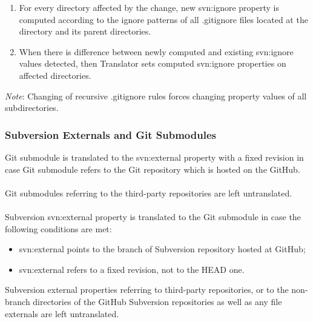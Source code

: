 \begin{enumerate}
\compactlist
\item For every directory affected by the change, new svn:ignore property is computed according to the ignore patterns of all .gitignore files located at the directory and its parent directories.\\
\item When there is difference between newly computed and existing svn:ignore values detected, then Translator sets computed svn:ignore properties on affected directories.\\
\end{enumerate}

\emph{Note}: Changing of recursive .gitignore rules forces changing property values of all subdirectories.

\subsubsection{Subversion Externals and Git Submodules}
\label{section_externals_and_submodules}
Git submodule is translated to the svn:external property with a fixed revision in case Git submodule refers to the Git repository
which is hosted on the GitHub.
\\\\
Git submodules referring to the third-party repositories are left untranslated.
\\\\
Subversion svn:external property is translated to the Git submodule in case the following conditions are met:
\begin{itemize}
\item svn:external points to the branch of Subversion repository hosted at GitHub;
\item svn:external refers to a fixed revision, not to the HEAD one.
\end{itemize}
Subversion external properties referring to third-party repositories, or to the non-branch directories of the GitHub Subversion repositories as
well as any file externals are left untranslated.